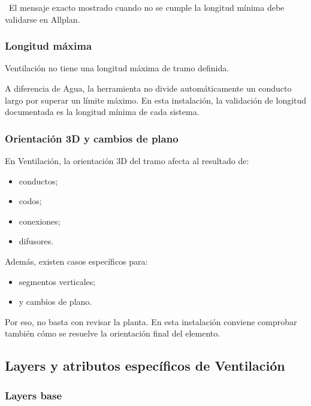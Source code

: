 \pendingtag\ El mensaje exacto mostrado cuando no se cumple la longitud mínima debe validarse en Allplan.

\subsubsection{Longitud máxima}

Ventilación no tiene una longitud máxima de tramo definida.

A diferencia de Agua, la herramienta no divide automáticamente un conducto largo por superar un límite máximo. En esta instalación, la validación de longitud documentada es la longitud mínima de cada sistema.

\subsubsection{Orientación 3D y cambios de plano}

En Ventilación, la orientación 3D del tramo afecta al resultado de:

\begin{itemize}
\item conductos;
\item codos;
\item conexiones;
\item difusores.
\end{itemize}

Además, existen casos específicos para:

\begin{itemize}
\item segmentos verticales;
\item y cambios de plano.
\end{itemize}

Por eso, no basta con revisar la planta. En esta instalación conviene comprobar también cómo se resuelve la orientación final del elemento.


\subsection{Layers y atributos específicos de Ventilación}

\subsubsection{Layers base}

